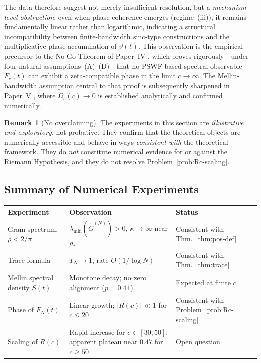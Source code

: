 \documentclass[12pt,a4paper]{amsart}
\theoremstyle{definition}
\newtheorem{remark}[theorem]{Remark}
\begin{document}
The data therefore suggest not merely insufficient resolution,
but a \emph{mechanism-level obstruction}: even when phase
coherence emerges (regime~(iii)), it remains fundamentally
linear rather than logarithmic, indicating a structural
incompatibility between finite-bandwidth sinc-type constructions
and the multiplicative phase accumulation of $\vartheta(t)$.
This observation is the empirical precursor to the No-Go Theorem
of Paper~IV \cite{PaperIV}, which proves rigorously---under four
natural assumptions~(A)--(D)---that no PSWF-based spectral observable
$F_c(t)$ can exhibit a zeta-compatible phase in the limit $c\to\infty$.
The Mellin-bandwidth assumption central to that proof is subsequently
sharpened in Paper~V \cite{PaperV}, where $\Omega_\varepsilon(c) \to 0$
is established analytically and confirmed numerically.

\begin{remark}[No overclaiming]\label{rem:no-overclaim}
The experiments in this section are \emph{illustrative and
exploratory}, not probative. They confirm that the theoretical
objects are numerically accessible and behave in ways
\emph{consistent with} the theoretical framework. They do
\emph{not} constitute numerical evidence for or against the
Riemann Hypothesis, and they do not resolve Problem~\ref{prob:Rc-scaling}.
\end{remark}

\subsection{Summary of Numerical Experiments}
\label{ssec:summary-num}

\begin{center}
\renewcommand{\arraystretch}{1.4}
\begin{tabular}{p{4.8cm} p{5.5cm} p{3.5cm}}
\hline
\textbf{Experiment} & \textbf{Observation} & \textbf{Status} \\
\hline
Gram spectrum, $\rho < 2/\pi$
& $\lambda_{\min}(\widetilde{G}^{(N)}) > 0$,
$\kappa \to \infty$ near $\rho_*$
& Consistent with Thm.~\ref{thm:pos-def} \\[2pt]
Trace formula
& $T_N \to 1$, rate $O(1/\log N)$
& Consistent with Thm.~\ref{thm:trace} \\[2pt]
Mellin spectral density $S(t)$
& Monotone decay; no zero alignment ($p = 0.41$)
& Expected at finite $c$ \\[2pt]
Phase of $F_N(t)$
& Linear growth; $|R(c)| \ll 1$ for $c \leq 20$
& Consistent with Problem~\ref{prob:Rc-scaling} \\[2pt]
Scaling of $R(c)$
& Rapid increase for $c \in [30,50]$;
apparent plateau near $0.47$ for $c \geq 50$
& Open question \\
\hline
\end{tabular}
\end{center}
\end{document}
